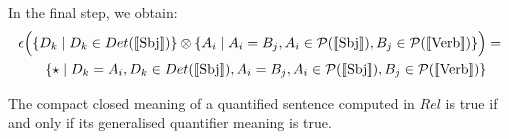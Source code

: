 \noindent
In the final step, we obtain:
\begin{align*}
\epsilon\Big(\{D_k \mid D_k \in Det(\semantics{\text{Sbj}})\} \otimes \{A_i \mid A_i = B_j, A_i \in {\cal P} (\semantics{\text{Sbj}}), B_j \in  {\cal P}(\semantics{\text{Verb}})\}\Big) &=\\
 \{\star \mid  D_k = A_i, D_k \in Det(\semantics{\text{Sbj}}), A_i = B_j, A_i \in {\cal P} (\semantics{\text{Sbj}}), B_j \in  {\cal P} (\semantics{\text{Verb}})\}
\end{align*}


\begin{proposition}
The  compact closed meaning of a quantified sentence computed in $Rel$ is true if and only if  its generalised quantifier meaning is true.
\end{proposition}

